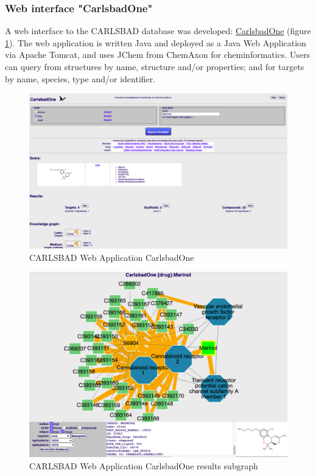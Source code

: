 \subsubsection{Web interface "CarlsbadOne"}

A web interface to the CARLSBAD database was developed:  \href{https://datascience.unm.edu/tomcat/carlsbad/carlsbadone}{CarlsbadOne} (figure \ref{fig:cb_cbone_01}). The web application is written Java and deployed as a Java Web Application via Apache Tomcat, and uses JChem from ChemAxon for cheminformatics. Users can query from structures by name, structure and/or properties; and for targets by name, species, type and/or identifier.

\begin{figure}
    \centering
    \includegraphics[width=\textwidth]{figures/carlsbad/CARLSBAD_CBOne_Marinol_01.png}
    \caption{CARLSBAD Web Application CarlsbadOne}
    \label{fig:cb_cbone_01}
\end{figure}

\begin{figure}
    \centering
    \includegraphics[width=\textwidth]{figures/carlsbad/CARLSBAD_CBOne_Marinol_02.png}
    \caption{CARLSBAD Web Application CarlsbadOne results subgraph}
    \label{fig:cb_cbone_02}
\end{figure}



